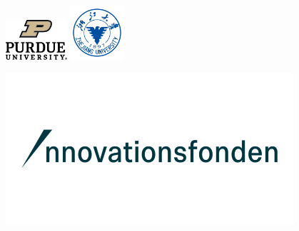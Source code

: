 \begin{center}
\vspace{2ex}

\includegraphics[width=0.17\textwidth, valign=c]{Phd_thesis/figs/logos/purdue.png}
\hspace{16ex}
\includegraphics[width=0.15\textwidth, valign=c]{Phd_thesis/figs/logos/zju.png}



\vspace{1ex}



\vspace{1ex}

\includegraphics[width=0.8\textwidth]{Phd_thesis/figs/logos/inno.png}
\end{center}

\cleardoublepage


